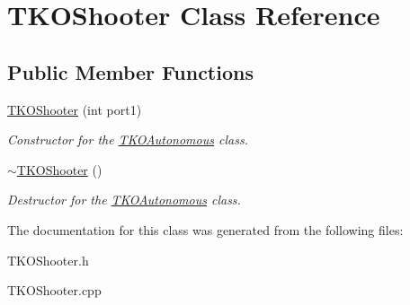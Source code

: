 \hypertarget{classTKOShooter}{\section{\-T\-K\-O\-Shooter \-Class \-Reference}
\label{classTKOShooter}
}
\subsection*{\-Public \-Member \-Functions}
\begin{DoxyCompactItemize}
\item 
\hypertarget{classTKOShooter_ad0fc3bb0b57e68e765479e030ad0224c}{\hyperlink{classTKOShooter_ad0fc3bb0b57e68e765479e030ad0224c}{\-T\-K\-O\-Shooter} (int port1)}\label{classTKOShooter_ad0fc3bb0b57e68e765479e030ad0224c}

\begin{DoxyCompactList}\small\item\em \-Constructor for the \hyperlink{classTKOAutonomous}{\-T\-K\-O\-Autonomous} class. \end{DoxyCompactList}\item 
\hypertarget{classTKOShooter_ae3d59bb88578fa48e014887e9ebfc9f2}{\hyperlink{classTKOShooter_ae3d59bb88578fa48e014887e9ebfc9f2}{$\sim$\-T\-K\-O\-Shooter} ()}\label{classTKOShooter_ae3d59bb88578fa48e014887e9ebfc9f2}

\begin{DoxyCompactList}\small\item\em \-Destructor for the \hyperlink{classTKOAutonomous}{\-T\-K\-O\-Autonomous} class. \end{DoxyCompactList}\end{DoxyCompactItemize}


\-The documentation for this class was generated from the following files\-:\begin{DoxyCompactItemize}
\item 
\-T\-K\-O\-Shooter.\-h\item 
\-T\-K\-O\-Shooter.\-cpp\end{DoxyCompactItemize}
